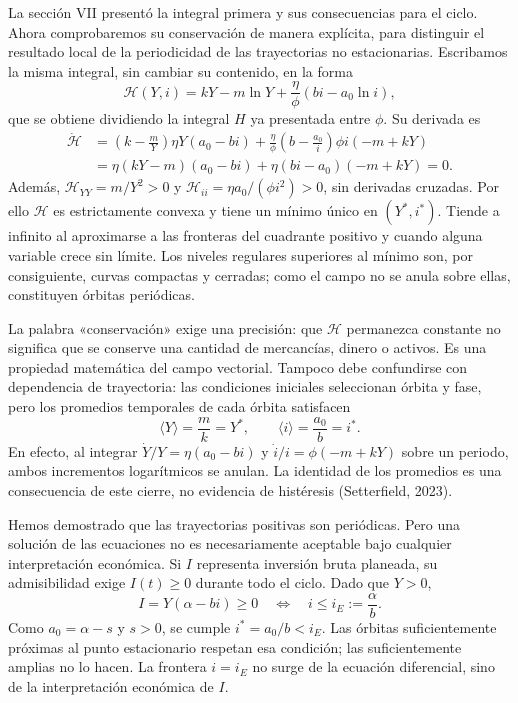 \documentclass[10.5pt,twoside]{article}
\newcounter{rsec}
\newcommand{\rsection}{%
  \refstepcounter{rsec}%
  \par\vspace{1.35em}%
  \begin{center}\fontsize{14}{16}\selectfont\Roman{rsec}\end{center}%
  \vspace{0.35em}%
}
\begin{document}
La sección VII presentó la integral primera y sus consecuencias para el ciclo. Ahora comprobaremos su conservación de manera explícita, para distinguir el resultado local de la periodicidad de las trayectorias no estacionarias. Escribamos la misma integral, sin cambiar su contenido, en la forma
\[
 \mathcal H(Y,i)=kY-m\ln Y+\frac{\eta}{\phi}(bi-a_0\ln i),
\]
que se obtiene dividiendo la integral $H$ ya presentada entre $\phi$. Su derivada es
\[
 \begin{aligned}
 \dot{\mathcal H}&=\left(k-\frac mY\right)\eta Y(a_0-bi)
 +\frac\eta\phi\left(b-\frac{a_0}i\right)\phi i(-m+kY)\\
 &=\eta(kY-m)(a_0-bi)+\eta(bi-a_0)(-m+kY)=0.
 \end{aligned}
\]
Además, $\mathcal H_{YY}=m/Y^2>0$ y $\mathcal H_{ii}=\eta a_0/(\phi i^2)>0$, sin derivadas cruzadas. Por ello $\mathcal H$ es estrictamente convexa y tiene un mínimo único en $(Y^*,i^*)$. Tiende a infinito al aproximarse a las fronteras del cuadrante positivo y cuando alguna variable crece sin límite. Los niveles regulares superiores al mínimo son, por consiguiente, curvas compactas y cerradas; como el campo no se anula sobre ellas, constituyen órbitas periódicas.

La palabra «conservación» exige una precisión: que $\mathcal H$ permanezca constante no significa que se conserve una cantidad de mercancías, dinero o activos. Es una propiedad matemática del campo vectorial. Tampoco debe confundirse con dependencia de trayectoria: las condiciones iniciales seleccionan órbita y fase, pero los promedios temporales de cada órbita satisfacen
\[
 \mathord{\langle Y\rangle=\frac mk=Y^*,\qquad
 \langle i\rangle=\frac{a_0}b=i^*.}
\]
En efecto, al integrar $\dot Y/Y=\eta(a_0-bi)$ y $\dot i/i=\phi(-m+kY)$ sobre un periodo, ambos incrementos logarítmicos se anulan. La identidad de los promedios es una consecuencia de este cierre, no evidencia de histéresis (Setterfield, 2023).

\rsection
Hemos demostrado que las trayectorias positivas son periódicas. Pero una solución de las ecuaciones no es necesariamente aceptable bajo cualquier interpretación económica. Si $I$ representa inversión bruta planeada, su admisibilidad exige $I(t)\geq0$ durante todo el ciclo. Dado que $Y>0$,
\[
 I=Y(\alpha-bi)\geq0\quad\Longleftrightarrow\quad
 i\leq i_E:=\frac\alpha b.
\]
Como $a_0=\alpha-s$ y $s>0$, se cumple $i^*=a_0/b<i_E$. Las órbitas suficientemente próximas al punto estacionario respetan esa condición; las suficientemente amplias no lo hacen. La frontera $i=i_E$ no surge de la ecuación diferencial, sino de la interpretación económica de $I$.
\end{document}
